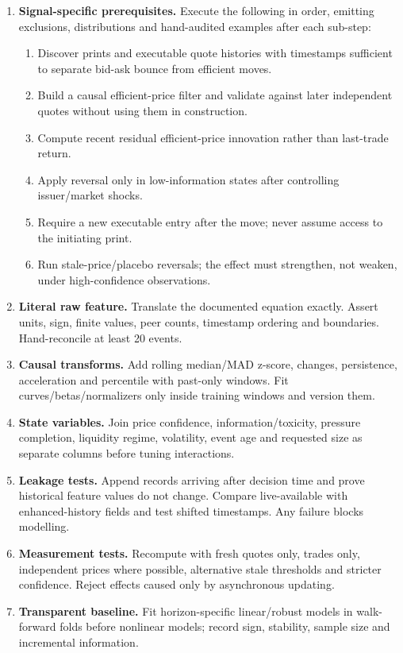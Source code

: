 \documentclass[10pt]{article}
\begin{document}
\begin{enumerate}[leftmargin=2em,label=\textbf{A\arabic*.}]
\item \textbf{Signal-specific prerequisites.} Execute the following in order, emitting exclusions, distributions and hand-audited examples after each sub-step:
\begin{enumerate}[label=\alph*)]
\item Discover prints and executable quote histories with timestamps sufficient to separate bid-ask bounce from efficient moves.
\item Build a causal efficient-price filter and validate against later independent quotes without using them in construction.
\item Compute recent residual efficient-price innovation rather than last-trade return.
\item Apply reversal only in low-information states after controlling issuer/market shocks.
\item Require a new executable entry after the move; never assume access to the initiating print.
\item Run stale-price/placebo reversals; the effect must strengthen, not weaken, under high-confidence observations.
\end{enumerate}
\item \textbf{Literal raw feature.} Translate the documented equation exactly. Assert units, sign, finite values, peer counts, timestamp ordering and boundaries. Hand-reconcile at least 20 events.
\item \textbf{Causal transforms.} Add rolling median/MAD z-score, changes, persistence, acceleration and percentile with past-only windows. Fit curves/betas/normalizers only inside training windows and version them.
\item \textbf{State variables.} Join price confidence, information/toxicity, pressure completion, liquidity regime, volatility, event age and requested size as separate columns before tuning interactions.
\item \textbf{Leakage tests.} Append records arriving after decision time and prove historical feature values do not change. Compare live-available with enhanced-history fields and test shifted timestamps. Any failure blocks modelling.
\item \textbf{Measurement tests.} Recompute with fresh quotes only, trades only, independent prices where possible, alternative stale thresholds and stricter confidence. Reject effects caused only by asynchronous updating.
\item \textbf{Transparent baseline.} Fit horizon-specific linear/robust models in walk-forward folds before nonlinear models; record sign, stability, sample size and incremental information.

\end{enumerate}
\end{document}
